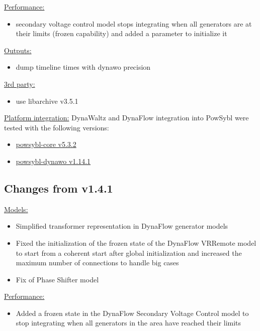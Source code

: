 \documentclass[a4paper, 12pt]{report}
\begin{document}
\underline{Performance:}

\begin{itemize}
\item secondary voltage control model stops integrating when all generators are at their limits (frozen capability) and added a parameter to initialize it
\end{itemize}

\underline{Outputs:}

\begin{itemize}
\item dump timeline times with dynawo precision
\end{itemize}

\underline{3rd party:}

\begin{itemize}
\item use libarchive v3.5.1
\end{itemize}

\underline{Platform integration:}
DynaWaltz and DynaFlow integration into PowSybl were tested with the following versions:
\begin{itemize}
\item \href{https://github.com/powsybl/powsybl-core/releases/tag/v5.3.2}{powsybl-core v5.3.2}
\item \href{https://github.com/powsybl/powsybl-dynawo/releases/tag/v1.14.1}{powsybl-dynawo v1.14.1}
\end{itemize}


\subsection{Changes from v1.4.1}
\underline{Models:}

\begin{itemize}
\item Simplified transformer representation in DynaFlow generator models
\item Fixed the initialization of the frozen state of the DynaFlow VRRemote model to start from a coherent start after global initialization and increased the maximum number of connections to handle big cases
\item Fix of Phase Shifter model
\end{itemize}

\underline{Performance:}

\begin{itemize}
\item Added a frozen state in the DynaFlow Secondary Voltage Control model to stop integrating when all generators in the area have reached their limits
\end{itemize}
\end{document}
